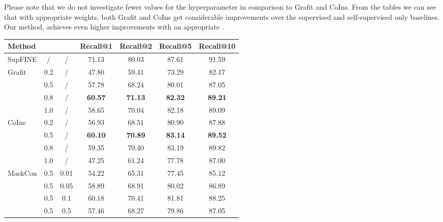 \documentclass[10pt,twocolumn,letterpaper]{article}
\begin{document}
Please note that we do not investigate fewer values for the hyperparameter  in comparison to Grafit and CoIns. From the tables we can see that with appropriate weights, both Grafit and CoIns get considerable improvements over the supervised and self-supervised only baselines. Our method, achieves even higher improvements with an appropriate .
\begin{table}[htbp]
\centering
\begin{tabular}{@{}l|c|c|cccc@{}}
\toprule
Method                  &  &  & Recall@1       & Recall@2       & Recall@5       & Recall@10      \\ \midrule
SupFINE                 & /   & /      & 71.13          & 80.03          & 87.61          & 91.59          \\ \midrule
\multirow{4}{*}{Grafit} & 0.2 & /      & 47.80          & 59.41          & 73.29          & 82.17          \\
                        & 0.5 & /      & 57.78          & 68.24          & 80.01          & 87.05          \\
                        & 0.8 & /      & \textbf{60.57} & \textbf{71.13} & \textbf{82.32} & \textbf{89.21} \\
                        & 1.0 & /      & 58.65          & 70.04          & 82.18          & 89.09          \\ \midrule
\multirow{4}{*}{CoIns}  & 0.2 & /      & 56.93          & 68.51          & 80.90          & 87.88          \\
                        & 0.5 & /      & \textbf{60.10} & \textbf{70.89} & \textbf{83.14} & \textbf{89.52} \\
                        & 0.8 & /      & 59.35          & 70.40          & 83.19          & 89.82          \\
                        & 1.0 & /      & 47.25          & 61.24          & 77.78          & 87.00          \\ \midrule
MaskCon                 & 0.5 & 0.01   & 54.22          & 65.31          & 77.45          & 85.12          \\
                        & 0.5 & 0.05   & 58.89          & 68.91          & 80.02          & 86.89          \\
                        & 0.5 & 0.1    & 60.18          & 70.41          & 81.81          & 88.25          \\
                        & 0.5 & 0.5    & 57.46          & 68.27          & 79.86          & 87.05          \\

\end{tabular}
\end{table}
\end{document}
